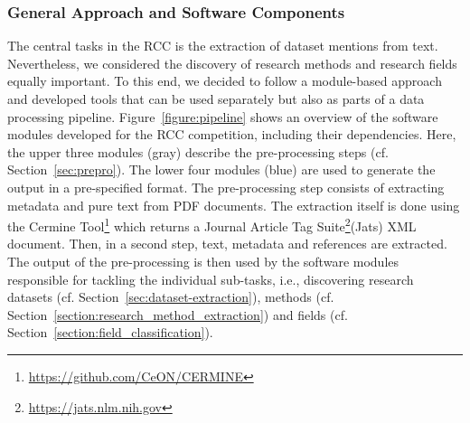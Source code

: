 
\subsubsection{General Approach and Software Components}
The central tasks in the RCC is the extraction of dataset mentions from text. 
Nevertheless, we considered the discovery of research methods and research fields equally important.
To this end, we decided to follow a module-based approach and developed tools that can be used separately but also as parts of a data processing pipeline.
Figure~\ref{figure:pipeline} shows an overview of the software modules developed for the RCC competition, including their dependencies. Here, the upper three modules (gray) describe the pre-processing steps (cf. Section~\ref{sec:prepro}).
The lower four modules (blue) are used to generate the output in a pre-specified format. 
The pre-processing step consists of extracting metadata and pure text from PDF documents. The extraction itself is done using the Cermine Tool\footnote{\url{https://github.com/CeON/CERMINE}} which returns a Journal Article Tag Suite\footnote{\url{https://jats.nlm.nih.gov}}(Jats) XML document. Then, in a second step,
text, metadata and references are extracted. The output of the pre-processing is then used by the software modules responsible for tackling the individual sub-tasks, i.e., discovering research datasets (cf. Section~\ref{sec:dataset-extraction}), methods (cf. Section~\ref{section:research_method_extraction}) and fields (cf. Section~\ref{section:field_classification}).


